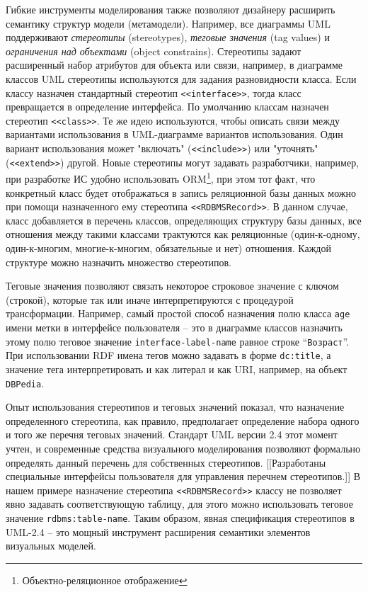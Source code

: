 \documentclass[conference]{IEEEtran} \IEEEoverridecommandlockouts
\begin{document}
Гибкие инструменты моделирования также позволяют дизайнеру расширить семантику структур модели (метамодели). Например, все диаграммы UML поддерживают \emph{стереотипы} (stereotypes), \emph{теговые значения} (tag values) и \emph{ограничения над объектами} (object constrains). Стереотипы задают расширенный набор атрибутов для объекта или связи, например, в диаграмме классов UML стереотипы используются для задания разновидности класса. Если классу назначен стандартный стереотип \texttt{<<interface>>}, тогда класс превращается в определение интерфейса. По умолчанию классам назначен стереотип \texttt{<<class>>}. Те же идею используются, чтобы описать связи между вариантами использования в UML-диаграмме вариантов использования. Один вариант использования может "включать" (\texttt{<<include>>}) или "уточнять" (\texttt{<<extend>>}) другой. Новые стереотипы могут задавать разработчики, например, при разработке ИС удобно использовать ORM\footnote{Объектно-реляционное отображение}, при этом тот факт, что конкретный класс будет отображаться в запись реляционной базы данных можно при помощи назначенного ему стереотипа \texttt{<<RDBMSRecord>>}. В данном случае, класс добавляется в перечень классов, определяющих структуру базы данных, все отношения между такими классами трактуются как реляционные (один-к-одному, один-к-многим, многие-к-многим, обязательные и нет) отношения. Каждой структуре можно назначить множество стереотипов.

Теговые значения позволяют связать некоторое строковое значение с ключом (строкой), которые так или иначе интерпретируются с процедурой трансформации. Например, самый простой способ назначения полю класса \texttt{age} имени метки в интерфейсе пользователя -- это в диаграмме классов назначить этому полю теговое значение \texttt{interface-label-name} равное строке ``\texttt{Возраст}''. При использовании RDF имена тегов можно задавать в форме \texttt{dc:title}, а значение тега интерпретировать и как литерал и как URI, например, на объект \texttt{DBPedia}.

Опыт использования стереотипов и теговых значений показал, что назначение определенного стереотипа, как правило, предполагает определение набора одного и того же перечня теговых значений. Стандарт UML версии 2.4 этот момент учтен, и современные средства визуального моделирования позволяют формально определять данный перечень для собственных стереотипов. [[Разработаны специальные интерфейсы пользователя для управления перечнем стереотипов.]] В нашем примере назначение стереотипа \texttt{<<RDBMSRecord>>} классу не позволяет явно задавать соответствующую таблицу, для этого можно использовать теговое значение \texttt{rdbms:table-name}. Таким образом, явная спецификация стереотипов в UML-2.4 -- это мощный инструмент расширения семантики элементов визуальных моделей.
\end{document}
